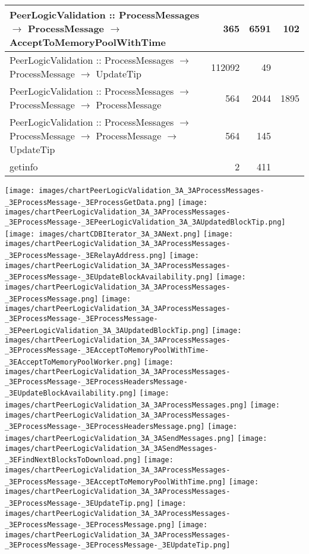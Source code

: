 \documentclass{article}
\begin{document}
\begin{tabular}{P{5cm}|r|r|r}
PeerLogicValidation :: ProcessMessages $\to$ ProcessMessage $\to$ AcceptToMemoryPoolWithTime& 365& 6591&102\\\hline
PeerLogicValidation :: ProcessMessages $\to$ ProcessMessage $\to$ UpdateTip& 112092& 49&\\\hline
PeerLogicValidation :: ProcessMessages $\to$ ProcessMessage $\to$ ProcessMessage& 564& 2044&1895\\\hline
PeerLogicValidation :: ProcessMessages $\to$ ProcessMessage $\to$ ProcessMessage $\to$ UpdateTip& 564& 145&\\\hline
getinfo& 2& 411&\\\hline
\end{tabular}

\texttt{[image: images/chartPeerLogicValidation\_3A\_3AProcessMessages-\_3EProcessMessage-\_3EProcessGetData.png]}
\texttt{[image: images/chartPeerLogicValidation\_3A\_3AProcessMessages-\_3EProcessMessage-\_3EPeerLogicValidation\_3A\_3AUpdatedBlockTip.png]}
\texttt{[image: images/chartCDBIterator\_3A\_3ANext.png]}
\texttt{[image: images/chartPeerLogicValidation\_3A\_3AProcessMessages-\_3EProcessMessage-\_3ERelayAddress.png]}
\texttt{[image: images/chartPeerLogicValidation\_3A\_3AProcessMessages-\_3EProcessMessage-\_3EUpdateBlockAvailability.png]}
\texttt{[image: images/chartPeerLogicValidation\_3A\_3AProcessMessages-\_3EProcessMessage.png]}
\texttt{[image: images/chartPeerLogicValidation\_3A\_3AProcessMessages-\_3EProcessMessage-\_3EProcessMessage-\_3EPeerLogicValidation\_3A\_3AUpdatedBlockTip.png]}
\texttt{[image: images/chartPeerLogicValidation\_3A\_3AProcessMessages-\_3EProcessMessage-\_3EAcceptToMemoryPoolWithTime-\_3EAcceptToMemoryPoolWorker.png]}
\texttt{[image: images/chartPeerLogicValidation\_3A\_3AProcessMessages-\_3EProcessMessage-\_3EProcessHeadersMessage-\_3EUpdateBlockAvailability.png]}
\texttt{[image: images/chartPeerLogicValidation\_3A\_3AProcessMessages.png]}
\texttt{[image: images/chartPeerLogicValidation\_3A\_3AProcessMessages-\_3EProcessMessage-\_3EProcessHeadersMessage.png]}
\texttt{[image: images/chartPeerLogicValidation\_3A\_3ASendMessages.png]}
\texttt{[image: images/chartPeerLogicValidation\_3A\_3ASendMessages-\_3EFindNextBlocksToDownload.png]}
\texttt{[image: images/chartPeerLogicValidation\_3A\_3AProcessMessages-\_3EProcessMessage-\_3EAcceptToMemoryPoolWithTime.png]}
\texttt{[image: images/chartPeerLogicValidation\_3A\_3AProcessMessages-\_3EProcessMessage-\_3EUpdateTip.png]}
\texttt{[image: images/chartPeerLogicValidation\_3A\_3AProcessMessages-\_3EProcessMessage-\_3EProcessMessage.png]}
\texttt{[image: images/chartPeerLogicValidation\_3A\_3AProcessMessages-\_3EProcessMessage-\_3EProcessMessage-\_3EUpdateTip.png]}
\end{document}
